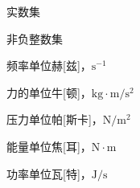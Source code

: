 %
%
%

\begin{symbols}
\item[$\mathbb{R}$] 实数集
\item[$\mathbb{N}$] 非负整数集
\item[Hz] 频率单位赫[兹]，$\mathrm{s}^{-1}$
\item[N] 力的单位牛[顿]，$\mathrm{kg}\cdot\mathrm{m}/\mathrm{s}^{2}$
\item[Pa] 压力单位帕[斯卡]，$\mathrm{N}/\mathrm{m}^{2}$
\item[J] 能量单位焦[耳]，$\mathrm{N}\cdot\mathrm{m}$
\item[W] 功率单位瓦[特]，$\mathrm{J}/\mathrm{s}$
\end{symbols}
